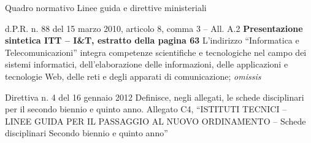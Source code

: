 \documentclass[italian]{beamer}
\newcommand{\blu}[1]{{\usebeamercolor[fg]{structure} #1}}
\newcommand\mybullet{\leavevmode%
\blu{\usebeamertemplate{itemize item}}\hspace{.5em}}
\begin{document}
\begin{frame}[allowframebreaks]{Quadro normativo}
{Linee guida e direttive ministeriali}

	\begin{block}{d.P.R. n. 88 del 15 marzo 2010, articolo 8, comma 3 -- All. A.2}
		\medbreak
		\noindent\textbf{Presentazione sintetica ITT -- I\&T, estratto della pagina 63}
		\medbreak
		\mybullet L'indirizzo ``Informatica e Telecomunicazioni'' integra \alert{competenze} scientifiche e \alert{tecnologiche nel campo} dei sistemi informatici, dell'elaborazione delle informazioni, delle applicazioni e tecnologie Web, \alert{delle reti} e degli apparati \alert{di comunicazione}; \textit{omissis}
	\end{block}
	
	\begin{block}{Direttiva n. 4  del 16 gennaio 2012}
		\medbreak
		Definisce, negli allegati, le schede disciplinari per il secondo biennio e quinto anno.
		\medbreak
		Allegato C4, ``ISTITUTI TECNICI -- LINEE GUIDA PER IL PASSAGGIO AL NUOVO ORDINAMENTO -- Schede disciplinari Secondo biennio e quinto anno''
	\end{block}\label{dir:16012012}
\end{frame}
\end{document}
